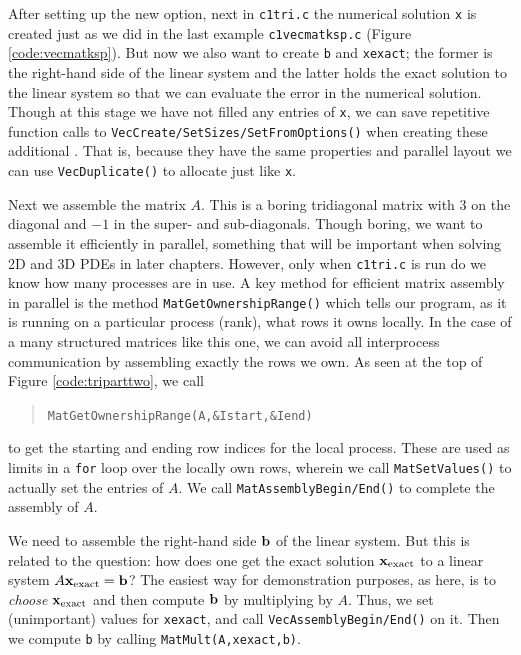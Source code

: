 After setting up the new option, next in \texttt{c1tri.c} the numerical solution \pVec \texttt{x} is created just as we did in the last example \texttt{c1vecmatksp.c} (Figure \ref{code:vecmatksp}).  But now we also want to create \pVecs \texttt{b} and \texttt{xexact}; the former is the right-hand side of the linear system and the latter holds the exact solution to the linear system so that we can evaluate the error in the numerical solution.  Though at this stage we have not filled any entries of \texttt{x}, we can save repetitive function calls to \texttt{VecCreate/SetSizes/SetFromOptions()} when creating these additional \pVecs.  That is, because they have the same properties and parallel layout we can use \texttt{VecDuplicate()} to allocate \pVecs just like \texttt{x}.

Next we assemble the matrix $A$.  This is a boring tridiagonal matrix with $3$ on the diagonal and $-1$ in the super- and sub-diagonals.  Though boring, we want to assemble it efficiently in parallel, something that will be important when solving 2D and 3D PDEs in later chapters.  However, only when \texttt{c1tri.c} is run do we know how many processes are in use.  A key method for efficient matrix assembly in parallel is the method \texttt{MatGetOwnershipRange()} which tells our program, as it is running on a particular process (rank), what rows it owns locally.  In the case of a many structured matrices like this one, we can avoid all interprocess communication by assembling exactly the rows we own.  As seen at the top of Figure \ref{code:triparttwo}, we call
\begin{quote}
\texttt{MatGetOwnershipRange(A,\&Istart,\&Iend)}
\end{quote}
to get the starting and ending row indices for the local process.  These are used as limits in a \texttt{for} loop over the locally own rows, wherein we call \texttt{MatSetValues()} to actually set the entries of $A$.  We call \texttt{MatAssemblyBegin/End()} to complete the assembly of $A$.

We need to assemble the right-hand side $\mathbf{b}$ of the linear system.  But this is related to the question: how does one get the exact solution $\mathbf{x}_{\text{exact}}$ to a linear system $A\mathbf{x}_{\text{exact}} = \mathbf{b}$?  The easiest way for demonstration purposes, as here, is to \emph{choose} $\mathbf{x}_{\text{exact}}$ and then compute $\mathbf{b}$ by multiplying by $A$.  Thus, we set (unimportant) values for \texttt{xexact}, and call \texttt{VecAssemblyBegin/End()} on it.  Then we compute \texttt{b} by calling \texttt{MatMult(A,xexact,b)}.

